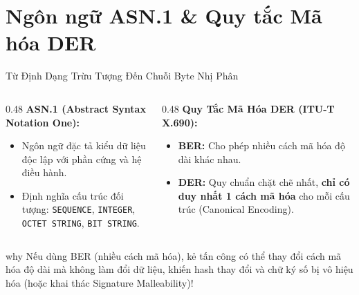\section{Ngôn ngữ ASN.1 \& Quy tắc Mã hóa DER}

\begin{frame}{Từ Định Dạng Trừu Tượng Đến Chuỗi Byte Nhị Phân}
  \begin{columns}[T]
    \begin{column}{0.48\textwidth}
      \textbf{ASN.1 (Abstract Syntax Notation One):}
      \begin{itemize}\small
        \item Ngôn ngữ đặc tả kiểu dữ liệu độc lập với phần cứng và hệ điều hành.
        \item Định nghĩa cấu trúc đối tượng: \texttt{SEQUENCE}, \texttt{INTEGER}, \texttt{OCTET STRING}, \texttt{BIT STRING}.
      \end{itemize}
    \end{column}
    \begin{column}{0.48\textwidth}
      \textbf{Quy Tắc Mã Hóa DER (ITU-T X.690):}
      \begin{itemize}\small
        \item \textbf{BER:} Cho phép nhiều cách mã hóa độ dài khác nhau.
        \item \textbf{DER:} Quy chuẩn chặt chẽ nhất, \textbf{chỉ có duy nhất 1 cách mã hóa} cho mỗi cấu trúc (Canonical Encoding).
      \end{itemize}
    \end{column}
  \end{columns}

  \begin{beyond}{why}
    Nếu dùng BER (nhiều cách mã hóa), kẻ tấn công có thể thay đổi cách mã hóa độ dài mà không làm đổi dữ liệu, khiến hash thay đổi và chữ ký số bị vô hiệu hóa (hoặc khai thác Signature Malleability)!
  \end{beyond}
\end{frame}

